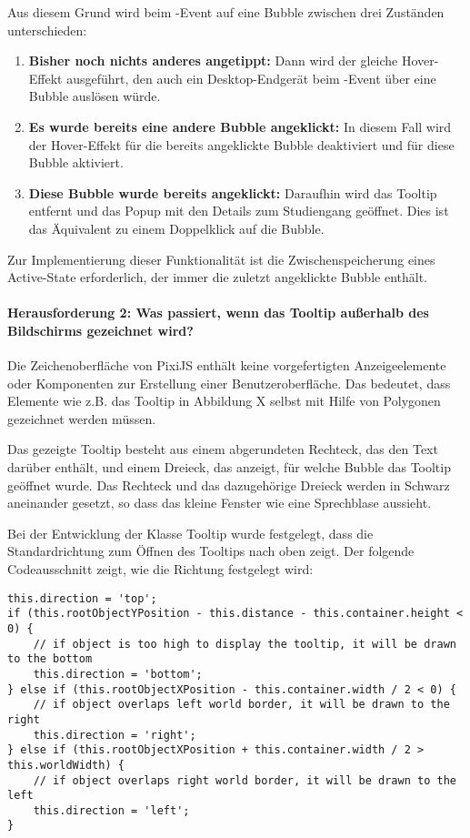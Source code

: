 Aus diesem Grund wird beim -Event auf eine Bubble zwischen drei Zuständen unterschieden:

\begin{enumerate}
    \item \textbf{Bisher noch nichts anderes angetippt:} Dann wird der gleiche Hover-Effekt ausgeführt, den auch ein Desktop-Endgerät beim -Event über eine Bubble auslösen würde.
    \item \textbf{Es wurde bereits eine andere Bubble angeklickt:} In diesem Fall wird der Hover-Effekt für die bereits angeklickte Bubble deaktiviert und für diese Bubble aktiviert.
    \item \textbf{Diese Bubble wurde bereits angeklickt:} Daraufhin wird das Tooltip entfernt und das Popup mit den Details zum Studiengang geöffnet. Dies ist das Äquivalent zu einem Doppelklick auf die Bubble.
\end{enumerate}

Zur Implementierung dieser Funktionalität ist die Zwischenspeicherung eines Active-State erforderlich, der immer die zuletzt angeklickte Bubble enthält.

\paragraph*{Herausforderung 2: Was passiert, wenn das Tooltip außerhalb des Bildschirms gezeichnet wird?}
Die Zeichenoberfläche von PixiJS enthält keine vorgefertigten Anzeigeelemente oder Komponenten zur Erstellung einer Benutzeroberfläche. Das bedeutet, dass Elemente wie z.B. das Tooltip in Abbildung X selbst mit Hilfe von Polygonen gezeichnet werden müssen.

Das gezeigte Tooltip besteht aus einem abgerundeten Rechteck, das den Text darüber enthält, und einem Dreieck, das anzeigt, für welche Bubble das Tooltip geöffnet wurde. Das Rechteck und das dazugehörige Dreieck werden in Schwarz aneinander gesetzt, so dass das kleine Fenster wie eine Sprechblase aussieht.

Bei der Entwicklung der Klasse Tooltip wurde festgelegt, dass die Standardrichtung zum Öffnen des Tooltips nach oben zeigt. Der folgende Codeausschnitt zeigt, wie die Richtung festgelegt wird:

\begin{lstlisting}[style=Python]
this.direction = 'top';
if (this.rootObjectYPosition - this.distance - this.container.height < 0) {
    // if object is too high to display the tooltip, it will be drawn to the bottom
    this.direction = 'bottom';
} else if (this.rootObjectXPosition - this.container.width / 2 < 0) {
    // if object overlaps left world border, it will be drawn to the right        
    this.direction = 'right';
} else if (this.rootObjectXPosition + this.container.width / 2 > this.worldWidth) {
    // if object overlaps right world border, it will be drawn to the left
    this.direction = 'left';
}
\end{lstlisting}

